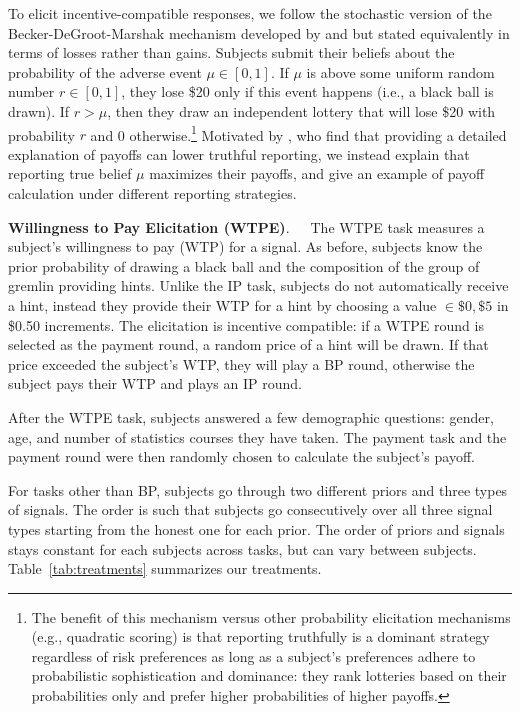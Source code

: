\documentclass[12pt,a4paper]{article}
\begin{document}
To elicit incentive-compatible responses, we follow the stochastic version of the Becker-DeGroot-Marshak mechanism developed by \citet{grether_testing_1992} and \citet{holt_update_2009} but stated equivalently in terms of losses rather than gains.
Subjects submit their beliefs about the probability of the adverse event $\mu \in [0,1]$. If $\mu$ is above some uniform random number $r\in[0,1]$, they lose \$20 only if this event happens (i.e., a black ball is drawn). If $r > \mu$, then they draw an independent lottery that will lose \$20 with probability $r$ and 0 otherwise.\footnote{The benefit of this mechanism versus other probability elicitation mechanisms (e.g., quadratic scoring) is that reporting truthfully is a dominant strategy regardless of risk preferences \citep{karni_mechanism_2009-1} as long as a subject's preferences adhere to probabilistic sophistication and dominance: they rank lotteries based on their probabilities only and prefer higher probabilities of higher payoffs.} Motivated by \citet{danz_belief_2020}, who find that providing a detailed explanation of payoffs can lower truthful reporting, we instead explain that reporting true belief $\mu$ maximizes their payoffs, and give an example of payoff calculation under different reporting strategies.

\bigskip
\noindent\textbf{Willingness to Pay Elicitation (WTPE)}.\ \ \ The WTPE task measures a subject's willingness to pay (WTP) for a signal. As before, subjects know the prior probability of drawing a black ball and the composition of the group of gremlin providing hints.  Unlike the IP task, subjects do not automatically receive a hint, instead they provide their WTP for a hint by choosing a value $\in {\$0,\$5}$ in \$0.50 increments. The elicitation is incentive compatible: if a WTPE round is selected as the payment round, a random price of a hint will be drawn. If that price exceeded the subject's WTP, they will play a BP round, otherwise the subject pays their WTP and plays an IP round.  

\vspace{10pt} 

After the WTPE task, subjects answered a few demographic questions: gender, age, and number of statistics courses they have taken. The payment task and the payment round were then randomly chosen to calculate the subject's payoff. 

For tasks other than BP, subjects go through two different priors and three types of signals. The order is such that subjects go consecutively over all three signal types starting from the honest one for each prior. The order of priors and signals stays constant for each subjects across tasks, but can vary between subjects. Table~\ref{tab:treatments} summarizes our treatments.
\end{document}
